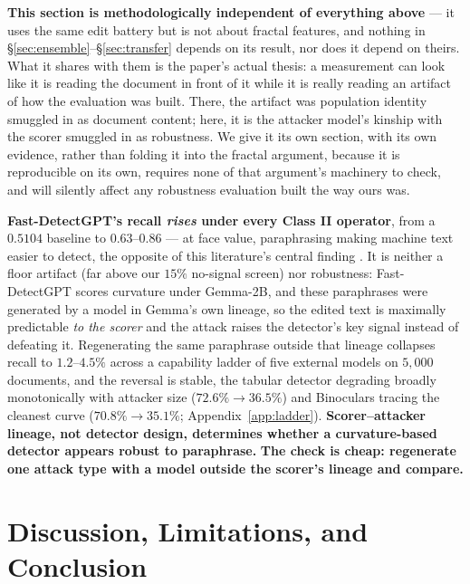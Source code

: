 \documentclass{article}
\begin{document}
\textbf{This section is methodologically independent of everything
above} --- it uses the same edit battery but is not about fractal features,
and nothing in \S\ref{sec:ensemble}--\S\ref{sec:transfer} depends on its
result, nor does it depend on theirs. What it shares with them is the
paper's actual thesis: a measurement can look like it is reading the
document in front of it while it is really reading an artifact of how the
evaluation was built. There, the artifact was population identity smuggled
in as document content; here, it is the attacker model's kinship with the
scorer smuggled in as robustness. We give it its own section, with its own
evidence, rather than folding it into the fractal argument, because it is
reproducible on its own, requires none of that argument's machinery to
check, and will silently affect any robustness evaluation built the way
ours was.

\textbf{Fast-DetectGPT's recall \emph{rises} under every Class II operator}, from a
$0.5104$ baseline to $0.63$--$0.86$ --- at face value, paraphrasing making machine
text easier to detect, the opposite of this literature's central finding
\citep{krishna2023paraphrasing,sadasivan2023canai}. It is neither a floor artifact
(far above our $15\%$ no-signal screen) nor robustness: Fast-DetectGPT
scores curvature under Gemma-2B, and these paraphrases were generated by a model in
Gemma's own lineage, so the edited text is maximally predictable \emph{to the
scorer} and the attack raises the detector's key signal instead of defeating it.
Regenerating the same paraphrase outside that lineage collapses recall to
$1.2$--$4.5\%$ across a capability ladder of five external models on
$5{,}000$ documents, and the reversal is stable, the tabular detector
degrading broadly monotonically with attacker size ($72.6\%\!\to\!36.5\%$)
and Binoculars tracing the cleanest curve ($70.8\%\!\to\!35.1\%$;
Appendix~\ref{app:ladder}). \textbf{Scorer--attacker lineage, not detector
design, determines whether a curvature-based detector appears robust to
paraphrase.} \textbf{The check is cheap: regenerate one attack type with a
model outside the scorer's lineage and compare.}

\section{Discussion, Limitations, and Conclusion}
\label{sec:limitations}
\end{document}
